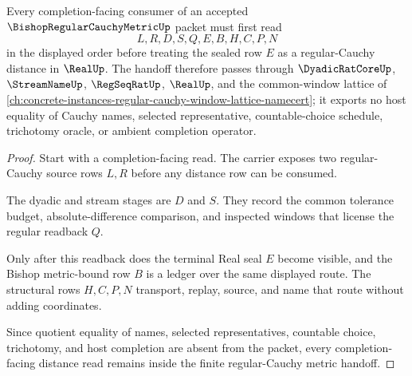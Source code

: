 \begin{theorem}
\label{thm:bishop-regular-cauchy-metric-real-completion-handoff}
Every completion-facing consumer of an accepted $\BishopRegularCauchyMetricUp$ packet must first read
$$
L,R,D,S,Q,E,B,H,C,P,N
$$
in the displayed order before treating the sealed row $E$ as a regular-Cauchy distance in $\RealUp$. The handoff therefore passes through $\DyadicRatCoreUp$, $\StreamNameUp$, $\RegSeqRatUp$, $\RealUp$, and the common-window lattice of \autoref{ch:concrete-instances-regular-cauchy-window-lattice-namecert}; it exports no host equality of Cauchy names, selected representative, countable-choice schedule, trichotomy oracle, or ambient completion operator.
\end{theorem}
\begin{proof}
Start with a completion-facing read. The carrier exposes two regular-Cauchy source rows $L,R$ before any distance row can be consumed.

The dyadic and stream stages are $D$ and $S$. They record the common tolerance budget, absolute-difference comparison, and inspected windows that license the regular readback $Q$.

Only after this readback does the terminal Real seal $E$ become visible, and the Bishop metric-bound row $B$ is a ledger over the same displayed route. The structural rows $H,C,P,N$ transport, replay, source, and name that route without adding coordinates.

Since quotient equality of names, selected representatives, countable choice, trichotomy, and host completion are absent from the packet, every completion-facing distance read remains inside the finite regular-Cauchy metric handoff.
\end{proof}


\begin{closurestatus}{\BishopRegularCauchyMetricUp}
  \theoryclosure{\seedClosure}
  \formalstatus{\unformalizedV}
\end{closurestatus}
